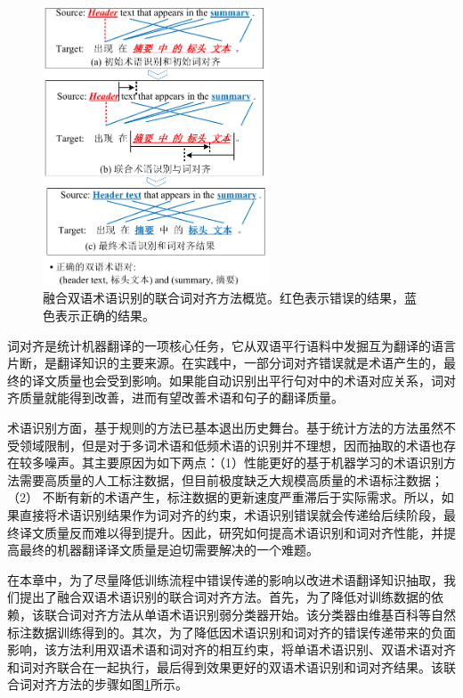 \begin{figure}[!tb]
	\centering
	\includegraphics[width=0.6\textwidth]{Figure/Figure_4_1.pdf}
	\caption{融合双语术语识别的联合词对齐方法概览。红色表示错误的结果，蓝色表示正确的结果。}
	\label{Fig_joint_term_overview}
\end{figure}

词对齐是统计机器翻译的一项核心任务，它从双语平行语料中发掘互为翻译的语言片断，是翻译知识的主要来源。在实践中，一部分词对齐错误就是术语产生的，最终的译文质量也会受到影响。如果能自动识别出平行句对中的术语对应关系，词对齐质量就能得到改善，进而有望改善术语和句子的翻译质量。

术语识别方面，基于规则的方法已基本退出历史舞台。基于统计方法的方法虽然不受领域限制，但是对于多词术语和低频术语的识别并不理想，因而抽取的术语也存在较多噪声。其主要原因为如下两点：（1）性能更好的基于机器学习的术语识别方法需要高质量的人工标注数据，但目前极度缺乏大规模高质量的术语标注数据；（2） 不断有新的术语产生，标注数据的更新速度严重滞后于实际需求。所以，如果直接将术语识别结果作为词对齐的约束，术语识别错误就会传递给后续阶段，最终译文质量反而难以得到提升。因此，研究如何提高术语识别和词对齐性能，并提高最终的机器翻译译文质量是迫切需要解决的一个难题。

在本章中，为了尽量降低训练流程中错误传递的影响以改进术语翻译知识抽取，我们提出了融合双语术语识别的联合词对齐方法。首先，为了降低对训练数据的依赖，该联合词对齐方法从单语术语识别弱分类器开始。该分类器由维基百科等自然标注数据训练得到的。其次，为了降低因术语识别和词对齐的错误传递带来的负面影响，该方法利用双语术语和词对齐的相互约束，将单语术语识别、双语术语对齐和词对齐联合在一起执行，最后得到效果更好的双语术语识别和词对齐结果。该联合词对齐方法的步骤如图\ref{Fig_joint_term_overview}所示。

